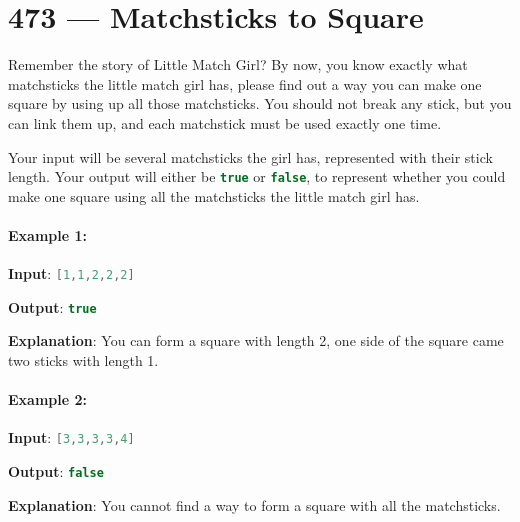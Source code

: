 \section{473 --- Matchsticks to Square}
Remember the story of Little Match Girl? By now, you know exactly what matchsticks the little match girl has, please find out a way you can make one square by using up all those matchsticks. You should not break any stick, but you can link them up, and each matchstick must be used exactly one time.

Your input will be several matchsticks the girl has, represented with their stick length. Your output will either be \lstinline[language=C++, basicstyle=\small\ttfamily, keywordstyle=\bfseries\color{green!40!black}]|true| or \lstinline[language=C++, basicstyle=\small\ttfamily, keywordstyle=\bfseries\color{green!40!black}]|false|, to represent whether you could make one square using all the matchsticks the little match girl has.

\paragraph{Example 1:}

\begin{flushleft}
\textbf{Input}: \lstinline[language=C++, basicstyle=\small\ttfamily, keywordstyle=\bfseries\color{green!40!black}]|[1,1,2,2,2]|

\textbf{Output}: \lstinline[language=C++, basicstyle=\small\ttfamily, keywordstyle=\bfseries\color{green!40!black}]|true|

\textbf{Explanation}: You can form a square with length 2, one side of the square came two sticks with length 1.
\end{flushleft}

\paragraph{Example 2:}
\begin{flushleft}
\textbf{Input}: \lstinline[language=C++, basicstyle=\small\ttfamily, keywordstyle=\bfseries\color{green!40!black}]|[3,3,3,3,4]|

\textbf{Output}: \lstinline[language=C++, basicstyle=\small\ttfamily, keywordstyle=\bfseries\color{green!40!black}]|false|

\textbf{Explanation}: You cannot find a way to form a square with all the matchsticks.

\end{flushleft}

